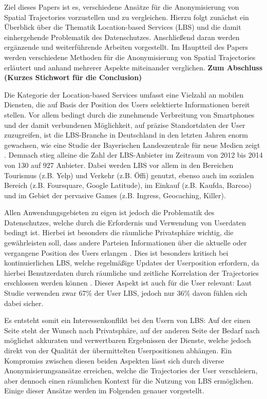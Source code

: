 Ziel dieses Papers ist es, verschiedene Ansätze für die Anonymisierung von Spatial Trajectories vorzustellen und zu vergleichen. Hierzu folgt zunächst ein Überblick über die Thematik Location-based Services (LBS) und die damit einhergehende Problematik des Datenschutzes. Anschließend daran werden ergänzende und weiterführende Arbeiten vorgestellt. Im Hauptteil des Papers werden verschiedene Methoden für die Anonymisierung von Spatial Trajectories erläutert und anhand mehrerer Aspekte miteinander verglichen. \textbf{Zum Abschluss (Kurzes Stichwort für die Conclusion)}

Die Kategorie der Location-based Services umfasst eine Vielzahl an mobilen Diensten, die auf Basis der Position des Users selektierte Informationen bereit stellen. Vor allem bedingt durch die zunehmende Verbreitung von Smartphones und der damit verbundenen Möglichkeit, auf präzise Standortdaten der User zuzugreifen, ist die LBS-Branche in Deutschland in den letzten Jahren enorm gewachsen, wie eine Studie der Bayerischen Landeszentrale für neue Medien zeigt \cite{Consulting2014}. Demnach stieg alleine die Zahl der LBS-Anbieter im Zeitraum von 2012 bis 2014 von 130 auf 927 Anbieter. Dabei werden LBS vor allem in den Bereichen Tourismus (z.B. Yelp) und Verkehr (z.B. Öffi) genutzt, ebenso auch im sozialen Bereich (z.B. Foursquare, Google Latitude), im Einkauf (z.B. Kaufda, Barcoo) und im Gebiet der pervasive Games (z.B. Ingress, Geocaching, Killer).

Allen Anwendungsgebieten zu eigen ist jedoch die Problematik des Datenschutzes, welche durch die Erfordernis und Verwendung von Userdaten bedingt ist. Hierbei ist besonders die räumliche Privatsphäre wichtig, die gewährleisten soll, dass andere Parteien Informationen über die aktuelle oder vergangene Position des Users erlangen \cite{Beresford2003}. Dies ist besonders kritisch bei kontinuierlichen LBS, welche regelmäßige Updates der Userposition erfordern, da hierbei Benutzerdaten durch räumliche und zeitliche Korrelation der Trajectories erschlossen werden können \cite{Chow2011}. Dieser Aspekt ist auch für die User relevant: Laut Studie verwenden zwar 67\% der User LBS, jedoch nur 36\% davon fühlen sich dabei sicher.

Es entsteht somit ein Interessenkonflikt bei den Usern von LBS: Auf der einen Seite steht der Wunsch nach Privatsphäre, auf der anderen Seite der Bedarf nach möglichst akkuraten und verwertbaren Ergebnissen der Dienste, welche jedoch direkt von der Qualität der übermittelten Userpositionen abhängen. Ein Kompromiss zwischen diesen beiden Aspekten lässt sich durch diverse Anonymisierungsansätze erreichen, welche die Trajectories der User verschleiern, aber dennoch einen räumlichen Kontext für die Nutzung von LBS ermöglichen. Einige dieser Ansätze werden im Folgenden genauer vorgestellt.